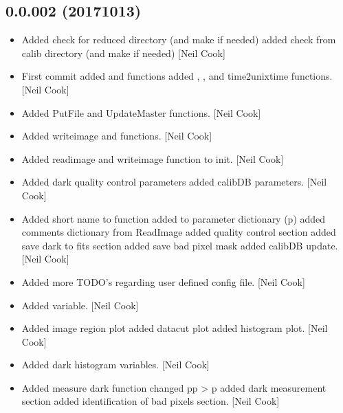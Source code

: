 \documentclass[a4paper,10pt,english]{report}
\begin{document}
\subsection{0.0.002 (2017\sphinxhyphen{}10\sphinxhyphen{}13)}
\label{\detokenize{misc/changelog:id567}}\begin{itemize}
\item {} 
Added check for reduced directory (and make if needed) added check
from calib directory (and make if needed) {[}Neil Cook{]}

\item {} 
First commit added  and  functions added
, , and time2unixtime
functions. {[}Neil Cook{]}

\item {} 
Added PutFile and UpdateMaster functions. {[}Neil Cook{]}

\item {} 
Added writeimage and  functions. {[}Neil Cook{]}

\item {} 
Added readimage and writeimage function to init. {[}Neil Cook{]}

\item {} 
Added dark quality control parameters added calibDB parameters. {[}Neil
Cook{]}

\item {} 
Added short name to  function added  to
parameter dictionary (p) added comments dictionary from ReadImage
added quality control section added save dark to fits section added
save bad pixel mask added calibDB update. {[}Neil Cook{]}

\item {} 
Added more TODO’s regarding user defined config file. {[}Neil Cook{]}

\item {} 
Added  variable. {[}Neil Cook{]}

\item {} 
Added image region plot added datacut plot added histogram plot. {[}Neil
Cook{]}

\item {} 
Added dark histogram variables. {[}Neil Cook{]}

\item {} 
Added measure dark function changed pp \textendash{}\textgreater{} p added dark measurement
section added identification of bad pixels section. {[}Neil Cook{]}

\end{itemize}
\end{document}
